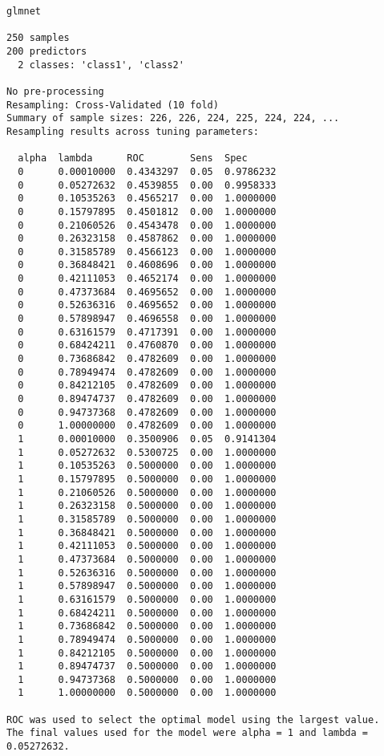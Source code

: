 \documentclass[
]{book}
\begin{document}
\begin{verbatim}
glmnet 

250 samples
200 predictors
  2 classes: 'class1', 'class2' 

No pre-processing
Resampling: Cross-Validated (10 fold) 
Summary of sample sizes: 226, 226, 224, 225, 224, 224, ... 
Resampling results across tuning parameters:

  alpha  lambda      ROC        Sens  Spec     
  0      0.00010000  0.4343297  0.05  0.9786232
  0      0.05272632  0.4539855  0.00  0.9958333
  0      0.10535263  0.4565217  0.00  1.0000000
  0      0.15797895  0.4501812  0.00  1.0000000
  0      0.21060526  0.4543478  0.00  1.0000000
  0      0.26323158  0.4587862  0.00  1.0000000
  0      0.31585789  0.4566123  0.00  1.0000000
  0      0.36848421  0.4608696  0.00  1.0000000
  0      0.42111053  0.4652174  0.00  1.0000000
  0      0.47373684  0.4695652  0.00  1.0000000
  0      0.52636316  0.4695652  0.00  1.0000000
  0      0.57898947  0.4696558  0.00  1.0000000
  0      0.63161579  0.4717391  0.00  1.0000000
  0      0.68424211  0.4760870  0.00  1.0000000
  0      0.73686842  0.4782609  0.00  1.0000000
  0      0.78949474  0.4782609  0.00  1.0000000
  0      0.84212105  0.4782609  0.00  1.0000000
  0      0.89474737  0.4782609  0.00  1.0000000
  0      0.94737368  0.4782609  0.00  1.0000000
  0      1.00000000  0.4782609  0.00  1.0000000
  1      0.00010000  0.3500906  0.05  0.9141304
  1      0.05272632  0.5300725  0.00  1.0000000
  1      0.10535263  0.5000000  0.00  1.0000000
  1      0.15797895  0.5000000  0.00  1.0000000
  1      0.21060526  0.5000000  0.00  1.0000000
  1      0.26323158  0.5000000  0.00  1.0000000
  1      0.31585789  0.5000000  0.00  1.0000000
  1      0.36848421  0.5000000  0.00  1.0000000
  1      0.42111053  0.5000000  0.00  1.0000000
  1      0.47373684  0.5000000  0.00  1.0000000
  1      0.52636316  0.5000000  0.00  1.0000000
  1      0.57898947  0.5000000  0.00  1.0000000
  1      0.63161579  0.5000000  0.00  1.0000000
  1      0.68424211  0.5000000  0.00  1.0000000
  1      0.73686842  0.5000000  0.00  1.0000000
  1      0.78949474  0.5000000  0.00  1.0000000
  1      0.84212105  0.5000000  0.00  1.0000000
  1      0.89474737  0.5000000  0.00  1.0000000
  1      0.94737368  0.5000000  0.00  1.0000000
  1      1.00000000  0.5000000  0.00  1.0000000

ROC was used to select the optimal model using the largest value.
The final values used for the model were alpha = 1 and lambda = 0.05272632.
\end{verbatim}
\end{document}
